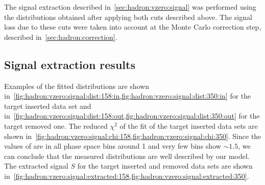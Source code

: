 The signal extraction described in~\cref{sec:hadron:vzero:signal}
was performed using the \minv distributions obtained
after applying both \vzero cuts described above.
The signal loss due to these cuts were taken into account
at the Monte Carlo correction step, described in~\cref{sec:hadron:correction}.

\subsection{\boldmath Signal extraction results}
\label{sec:hadron:vzero:results}

Examples of the fitted \minv distributions are shown
in~\cref{fig:hadron:vzero:signal:dist:158:in,fig:hadron:vzero:signal:dist:350:in}
for the target inserted data set and
in~\cref{fig:hadron:vzero:signal:dist:158:out,fig:hadron:vzero:signal:dist:350:out}
for the target removed one.
The reduced $\chi^2$ of the \minv fit of the target inserted data sets are shown
in~\cref{fig:hadron:vzero:signal:chi:158,fig:hadron:vzero:signal:chi:350}.
Since the values of \redchisq are in all phase space bins around 1
and very few bins show \redchisq $\sim 1.5$, we can conclude that the
measured \minv distributions are well described by our \minv model.   
The extracted signal $S$ for the target inserted and removed data sets are shown
in~\cref{fig:hadron:vzero:signal:extracted:158,fig:hadron:vzero:signal:extracted:350}.


